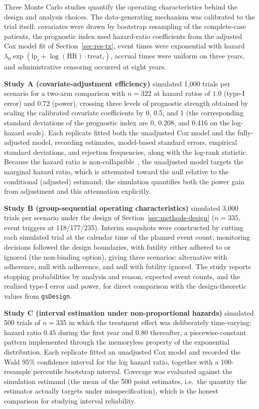 Three Monte Carlo studies quantify the operating characteristics behind
the design and analysis choices. The data-generating mechanism was
calibrated to the trial itself: covariates were drawn by bootstrap
resampling of the complete-case patients, the prognostic index used
hazard-ratio coefficients from the adjusted Cox model fit of
Section~\ref{sec:res-tx}, event times were exponential with hazard
$\lambda_0 \exp(\mathrm{lp}_i + \log(\mathrm{HR}) \cdot
\mathrm{treat}_i)$, accrual times were uniform on three years, and
administrative censoring occurred at eight years.

\textbf{Study A (covariate-adjustment efficiency)} simulated 1{,}000
trials per scenario for a two-arm comparison with $n=322$ at hazard
ratios of $1.0$ (type-I error) and $0.72$ (power), crossing three levels
of prognostic strength obtained by scaling the calibrated covariate
coefficients by 0, 0.5, and 1 (the corresponding standard deviations of
the prognostic index are 0, 0.208, and 0.416 on the log-hazard scale).
Each replicate fitted both the unadjusted Cox model and the
fully-adjusted model, recording estimates, model-based standard errors,
empirical standard deviations, and rejection frequencies, along with the
log-rank statistic. Because the hazard ratio is
non-collapsible~\cite{martinussen2013}, the unadjusted model targets the
marginal hazard ratio, which is attenuated toward the null relative to
the conditional (adjusted) estimand; the simulation quantifies both the
power gain from adjustment and this attenuation explicitly.

\textbf{Study B (group-sequential operating characteristics)} simulated
3{,}000 trials per scenario under the design of
Section~\ref{sec:methods-design} ($n = 335$, event triggers at
118/177/235). Interim snapshots were constructed by cutting each
simulated trial at the calendar time of the planned event count;
monitoring decisions followed the design boundaries, with futility
either adhered to or ignored (the non-binding option), giving three
scenarios: alternative with adherence, null with adherence, and null
with futility ignored. The study reports stopping probabilities by
analysis and reason, expected event counts, and the realized type-I
error and power, for direct comparison with the design-theoretic values
from \texttt{gsDesign}.

\textbf{Study C (interval estimation under non-proportional hazards)}
simulated 500 trials of $n=335$ in which the treatment effect was
deliberately time-varying: hazard ratio $0.45$ during the first year and
$0.80$ thereafter, a piecewise-constant pattern implemented through the
memoryless property of the exponential distribution. Each replicate
fitted an unadjusted Cox model and recorded the Wald 95\% confidence
interval for the log hazard ratio, together with a 100-resample
percentile bootstrap interval. Coverage was evaluated against the
simulation estimand (the mean of the 500 point estimates, i.e.\ the
quantity the estimator actually targets under misspecification), which
is the honest comparison for studying interval reliability.

